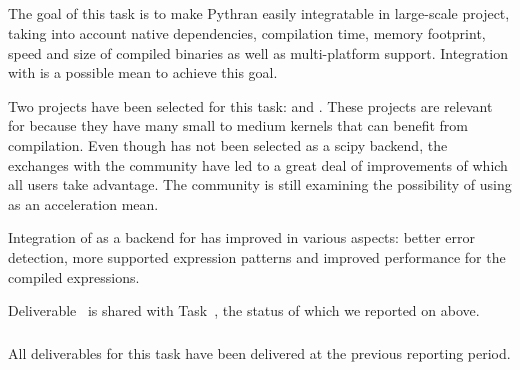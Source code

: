   \subparagraph{}

  The goal of this task is to make Pythran easily integratable in large-scale
  project, taking into account native dependencies, compilation time, memory
  footprint, speed and size of compiled binaries as well as multi-platform
  support. Integration with  is a possible mean to achieve
  this goal.

  Two projects have been selected for this task:  and
  . These projects are relevant for 
  because they have many small to medium kernels that can benefit from
  compilation. Even though  has not been selected as a scipy
  backend, the exchanges with the community have led to a great deal of
  improvements of which all  users take advantage.  The
   community is still examining the possibility of using
   as an acceleration mean.

  Integration of   as a  backend for
   has improved in various aspects: better error detection,
  more supported expression patterns and improved performance for the compiled
  expressions.

Deliverable~ is shared with
Task~, the status of which we reported on above.

  \subparagraph{}
  

  All deliverables for this task have been delivered at the previous
  reporting period.

